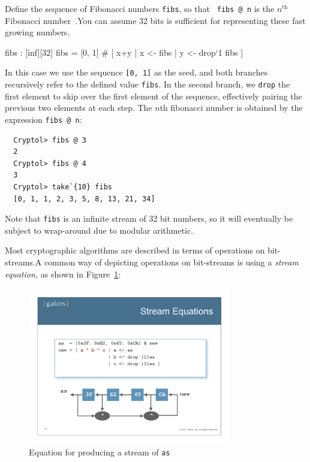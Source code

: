 \begin{Exercise}\label{ex:recfun:5} 
  Define the sequence of Fibonacci numbers {\tt fibs}, so that {\tt
    fibs @ n} is the $n^{\mbox{th}}$ Fibonacci
  number~\cite{wiki:fibonacci}.\glosFibonacci You can assume 32 bits
  is sufficient for representing these fast growing
  numbers. 
\end{Exercise}
\begin{Answer}
\begin{code}
  fibs : [inf][32]
  fibs = [0, 1] # [ x+y | x <- fibs
                        | y <- drop`{1} fibs
                  ]
\end{code}
In this case we use the sequence {\tt [0, 1]} as the seed, and both
branches recursively refer to the defined value {\tt fibs}. In the
second branch, we {\tt drop} the first element to skip over the first
element of the sequence, effectively pairing the previous two elements
at each step.  The $n$th fibonacci number is obtained by the
expression {\tt fibs @ n}:\indDrop
\begin{Verbatim}
  Cryptol> fibs @ 3
  2
  Cryptol> fibs @ 4
  3
  Cryptol> take`{10} fibs
  [0, 1, 1, 2, 3, 5, 8, 13, 21, 34]
\end{Verbatim}
Note that {\tt fibs} is an infinite stream of 32 bit numbers, so it
will eventually be subject to wrap-around due to modular
arithmetic.\indModular
\end{Answer}


Most cryptographic algorithms are described in terms of operations on
bit-streams.\indStreamEquation A common way of depicting operations on
bit-streams is using a {\it stream equation,} as shown in
Figure~\ref{fig:streamDiagram}:
\begin{figure}[htbp]
\centering
\includegraphics[width=3.5in]{crashCourse/streamDiagram.pdf}
\caption{Equation for producing a stream of {\tt as}}
\label{fig:streamDiagram}
\end{figure}

